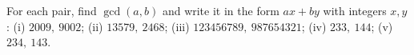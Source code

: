For each pair, find $\gcd(a,b)$ and write it in the form $ax+by$ with integers $x,y$:
(i) $2009,\ 9002$; (ii) $13579,\ 2468$; (iii) $123456789,\ 987654321$; (iv) $233,\ 144$; (v) $234,\ 143$.
